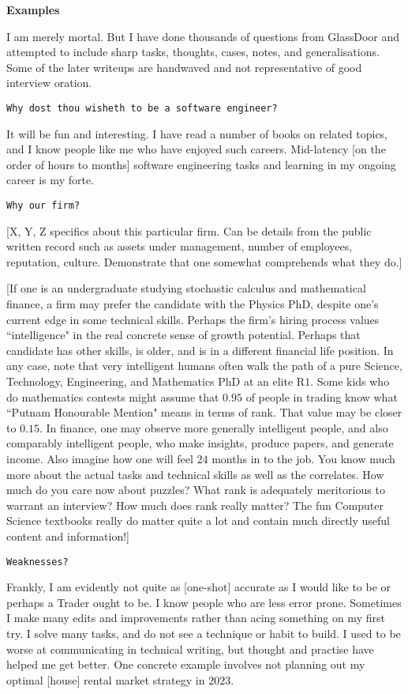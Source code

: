 \textbf{Examples}

I am merely mortal. But I have done thousands of questions from GlassDoor and attempted to include sharp tasks, thoughts, cases, notes, and generalisations. Some of the later writeups are handwaved and not representative of good interview oration.

\texttt{Why dost thou wisheth to be a software engineer?}

It will be fun and interesting. I have read a number of books on related topics, and I know people like me who have enjoyed such careers. Mid-latency [on the order of hours to months] software engineering tasks and learning in my ongoing career is my forte.

\texttt{Why our firm?}

[X, Y, Z specifics about this particular firm. Can be details from the public written record such as assets under management, number of employees, reputation, culture. Demonstrate that one somewhat comprehends what they do.]

[If one is an undergraduate studying stochastic calculus and mathematical finance, a firm may prefer the candidate with the Physics PhD, despite one's current edge in some technical skills. Perhaps the firm's hiring process values ``intelligence" in the real concrete sense of growth potential. Perhaps that candidate has other skills, is older, and is in a different financial life position. In any case, note that very intelligent humans often walk the path of a pure Science, Technology, Engineering, and Mathematics PhD at an elite R$1$. Some kids who do mathematics contests might assume that $0.95$ of people in trading know what ``Putnam Honourable Mention" means in terms of rank. That value may be closer to $0.15$. In finance, one may observe more generally intelligent people, and also comparably intelligent people, who make insights, produce papers, and generate income. Also imagine how one will feel $24$ months in to the job. You know much more about the actual tasks and technical skills as well as the correlates. How much do you care now about puzzles? What rank is adequately meritorious to warrant an interview? How much does rank really matter? The fun Computer Science textbooks really do matter quite a lot and contain much directly useful content and information!]

\texttt{Weaknesses?}

Frankly, I am evidently not quite as [one-shot] accurate as I would like to be or perhaps a Trader ought to be. I know people who are less error prone. Sometimes I make many edits and improvements rather than acing something on my first try. I solve many tasks, and do not see a technique or habit to build. I used to be worse at communicating in technical writing, but thought and practise have helped me get better. One concrete example involves not planning out my optimal [house] rental market strategy in $2023$.

